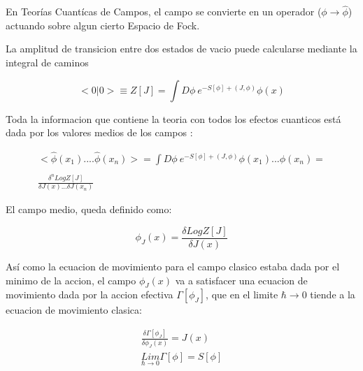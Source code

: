 En Teorías Cuantícas de Campos, el campo se convierte en un operador ($\phi \rightarrow \hat{\phi}$) actuando sobre algun cierto Espacio de Fock.   %

La amplitud de transicion entre dos estados de vacio puede calcularse mediante la integral de caminos

\begin{equation}
< 0 | 0 >  \equiv Z [J] = 
\int D \phi \ e ^{- S[ \phi ] + (J, \phi )} \phi (x)
\end{equation}

Toda la informacion que contiene la teoria con todos los efectos cuanticos está dada por los valores medios de los campos :

\begin{equation}
\begin{array}{c}
< \hat{ \phi  } (x _1) .... \hat{\phi  } (x _n) > = 
\int D \phi \ e ^{- S[ \phi ] + (J, \phi )} \phi (x _1) ... \phi (x _n) = \\ \\
\frac{\delta ^n Log Z[J] }{ \delta J(x) ... \delta J(x _n) }
\end{array}
\end{equation}

El campo medio, queda definido como:

\begin{equation}
\phi _J (x) = \frac{\delta Log Z[J] }{\delta J(x)} 
\end{equation}


Así como la ecuacion de movimiento para el campo clasico estaba dada por el minimo de la accion, el campo $ \phi _J (x) $ va a satisfacer una ecuacion de movimiento dada por la accion efectiva $ \Gamma [\phi _J] $, que en el limite $\hbar \rightarrow 0$ tiende a la ecuacion de movimiento clasica:


\begin{equation}
\begin{array}{c}
\frac{\delta \Gamma [ \phi _J ]  }{\delta \phi _J (x)  } = 
J (x) \\
\underset{ \hbar \rightarrow 0 }{ Lim  } \Gamma [ \phi  ] = S [ \phi ]
\end{array}
\label{eq.accion1}
\end{equation}

